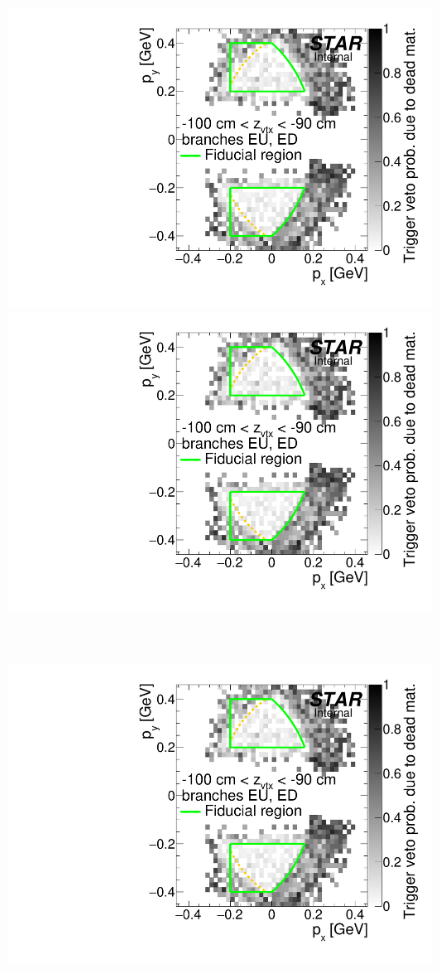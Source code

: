 \begin{figure}[hb]\ContinuedFloat
\centering
\parbox{0.495\textwidth}{
  \centering
  \includegraphics[width=\linewidth,page=35]{graphics/corrections/mcDeadMatProbPxPy.pdf}\\
  \includegraphics[width=\linewidth,page=37]{graphics/corrections/mcDeadMatProbPxPy.pdf}
}~
\parbox{0.495\textwidth}{
  \centering
  \includegraphics[width=\linewidth,page=36]{graphics/corrections/mcDeadMatProbPxPy.pdf}\\
}
\end{figure}
